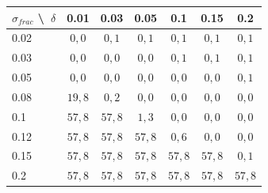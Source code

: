 
\begin{tabular}{@{}lcccccc@{}}
\toprule
$\sigma_{frac}$ \textbackslash\ $\delta$ & 0.01 & 0.03 & 0.05 & 0.1 & 0.15 & 0.2 \\
\midrule
0.02 & $0{,}0$ & $0{,}1$ & $0{,}1$ & $0{,}1$ & $0{,}1$ & $0{,}1$ \\
0.03 & $0{,}0$ & $0{,}0$ & $0{,}0$ & $0{,}1$ & $0{,}1$ & $0{,}1$ \\
0.05 & $0{,}0$ & $0{,}0$ & $0{,}0$ & $0{,}0$ & $0{,}0$ & $0{,}1$ \\
0.08 & $19{,}8$ & $0{,}2$ & $0{,}0$ & $0{,}0$ & $0{,}0$ & $0{,}0$ \\
0.1 & $57{,}8$ & $57{,}8$ & $1{,}3$ & $0{,}0$ & $0{,}0$ & $0{,}0$ \\
0.12 & $57{,}8$ & $57{,}8$ & $57{,}8$ & $0{,}6$ & $0{,}0$ & $0{,}0$ \\
0.15 & $57{,}8$ & $57{,}8$ & $57{,}8$ & $57{,}8$ & $57{,}8$ & $0{,}1$ \\
0.2 & $57{,}8$ & $57{,}8$ & $57{,}8$ & $57{,}8$ & $57{,}8$ & $57{,}8$ \\
\bottomrule
\end{tabular}
